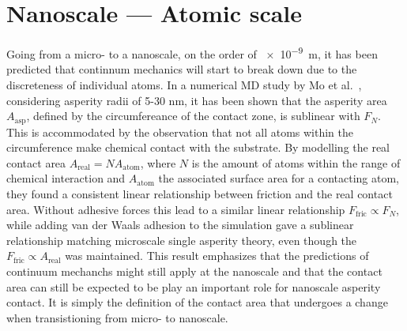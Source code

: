 \section{Nanoscale --- Atomic scale}\label{sec:nanoscale}
Going from a micro- to a nanoscale, on the order of \SI{e-9}{m}, it has been
predicted that continnum mechanics will start to break down \cite{luan_breakdown_2005} due to the discreteness of individual atoms. In a numerical \acrshort{MD} study by Mo et
al.\ \cite{mo_friction_2009}, considering asperity radii of 5-30 nm, it has been
shown that the asperity area $A_{\text{asp}}$, defined by the circumfereance of
the contact zone, is sublinear with $F_N$. This is accommodated by the
observation that not all atoms within the circumference make chemical contact
with the substrate. By modelling the real contact area $A_{\text{real}} =
NA_{\text{atom}}$, where $N$ is the amount of atoms within the range of chemical
interaction and $A_{\text{atom}}$ the associated surface area for a contacting atom, they
found a consistent linear relationship between friction and the real contact
area. Without adhesive forces this lead to a similar linear relationship
$F_{\text{fric}} \propto F_N$, while adding van der Waals adhesion to the
simulation gave a sublinear relationship matching microscale single asperity theory, even though the $F_{\text{fric}}
\propto A_{\text{real}}$ was maintained. This result emphasizes that the predictions of continuum mechanchs might still apply at the nanoscale and that the contact area can still be expected to be play an important role for nanoscale asperity contact. It is simply the definition of the contact area that undergoes a change when transistioning from micro- to nanoscale. 



